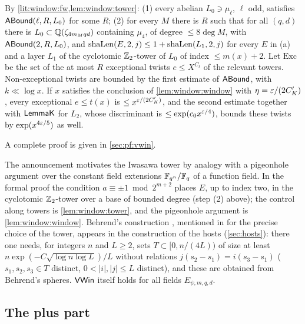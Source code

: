\begin{proofoutline}
By \cref{lit:window:fw,lem:window:tower}: (1) every abelian $L_0\ni\mu_\ell$, $\ell$ odd, satisfies
$\mathsf{ABound}(\ell,R,L_0)$ for some $R$; (2) for every $M$ there is $R$ such that for all $(q,d)$ there is
$L_0\subset\mathbb{Q}(\zeta_{4m_Mqd})$ containing $\mu_4$, of degree $\le8\deg M$, with $\mathsf{ABound}(2,R,L_0)$, and
$\mathrm{shaLen}(E,2,j)\le1+\mathrm{shaLen}(L_1,2,j)$ for every $E$ in (a) and a layer $L_1$ of the cyclotomic $\mathbb{Z}_2$-tower of
$L_0$ of index $\le m(x)+2$. Let $\mathrm{Exc}$ be the set of the at most $R$ exceptional twists $e\le X^{C_t}$ of the
relevant towers. Non-exceptional twists are bounded by the first estimate of $\mathsf{ABound}$, with $k\ll\log x$.
If $x$ satisfies the conclusion of \cref{lem:window:window} with $\eta=\varepsilon/(2C'_K)$, every exceptional $e\le t(x)$
is $\le x^{\varepsilon/(2C'_K)}$, and the second estimate together with $\mathsf{LemmaK}$ for $L_2$, whose discriminant is
$\le\exp(c_0x^{\varepsilon/4})$, bounds these twists by $\exp(x^{4\varepsilon/5})$ as well.

A complete proof is given in \cref{sec:pf:vwin}.
\end{proofoutline}

\begin{remark}\label{rem:window:iwasawa}
The announcement \cite{Announcement2026} motivates the Iwasawa tower by analogy with a pigeonhole argument over the
constant field extensions $\mathbb{F}_{q^n}/\mathbb{F}_q$ of a function field. In the formal proof the condition
$a\equiv\pm1\bmod2^{m+2}$ places $E$, up to index two, in the cyclotomic $\mathbb{Z}_2$-tower over a base of bounded degree
(step (2) above); the control along towers is \cref{lem:window:tower}, and the pigeonhole argument is
\cref{lem:window:window}. Behrend's construction \cite{Behrend1946}, mentioned in \cite{Announcement2026} for the
precise choice of the tower, appears in the construction of the hosts (\cref{sec:hosts}): there one needs, for
integers $n$ and $L\ge2$, sets $T\subset[0,n/(4L))$ of size at least $n\exp(-C\sqrt{\log n\log L})/L$ without relations
$j(s_2-s_1)=i(s_3-s_1)$ ($s_1,s_2,s_3\in T$ distinct, $0<|i|,|j|\le L$ distinct), and these are obtained from
Behrend's spheres. $\mathsf{VWin}$ itself holds for all fields $E_{\psi,m,q,d}$.
\end{remark}

\subsection{The plus part}\label{sec:window:plus}

